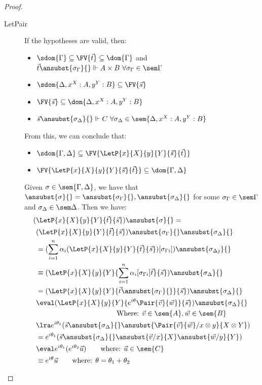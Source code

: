 \begin{proof}
\begin{description}
    \item[LetPair] If the hypotheses are valid, then:
    \begin{itemize}
        \item $\sdom{\Gamma}\subseteq \FV{\vec t} \subseteq \dom{\Gamma}$ and $\vec t \ansubst{\sigma_\Gamma}{}\Vdash A\times B\ \forall \sigma_\Gamma\in\sem\Gamma$
        \item $\sdom{\Delta, {x}^{X}:A, {y}^{Y}:B}\subseteq\FV{\vec s}$
        \item $\FV{\vec{s}}\subseteq \dom{\Delta, {x}^{X}:A, {y}^{Y}:B}$
        \item $\vec s \ansubst{\sigma_\Delta}{}\Vdash C\ \forall \sigma_\Delta\in\sem{\Delta, {x}^{X}:A, {y}^{Y}:B}$
    \end{itemize}
    From this, we can conclude that:
    \begin{itemize}
        \item $\sdom{\Gamma,\Delta}\subseteq\FV{\LetP{x}{X}{y}{Y}{\vec{s}}{\vec{t}}}$
        \item $\FV{\LetP{x}{X}{y}{Y}{\vec{s}}{\vec{t}}}\subseteq\dom{\Gamma,\Delta}$
    \end{itemize}
    
    Given $\sigma\in\sem{\Gamma,\Delta}$, we have that $\ansubst{\sigma}{}=\ansubst{\sigma_\Gamma}{},\ansubst{\sigma_\Delta}{}$ for some $\sigma_\Gamma\in\sem\Gamma$ and $\sigma_\Delta\in\sem\Delta$. Then we have:
    \begin{align*}
        (&\LetP{x}{X}{y}{Y}{\vec{t}}{\vec{s}})\ansubst{\sigma}{} = \\
        &(\LetP{x}{X}{y}{Y}{\vec{t}}{\vec{s}})\ansubst{\sigma_\Gamma}{}\ansubst{\sigma_\Delta}{}\\
        &= (\sum_{i=1}^{n}\alpha_i(\LetP{x}{X}{y}{Y}{\vec{t}}{\vec{s}})[\sigma_{\Gamma i}])\ansubst{\sigma_{\Delta j}}{}\\
        &\equiv (\LetP{x}{X}{y}{Y}{\sum_{i=1}^{n}\alpha_i[\sigma_{\Gamma i}]\vec{t}}{\vec{s}})\ansubst{\sigma_\Delta}{}\\
        &= (\LetP{x}{X}{y}{Y}{\vec{t}\ansubst{\sigma_\Gamma}{}}{\vec{s}})\ansubst{\sigma_\Delta}{}\\
        &\eval (\LetP{x}{X}{y}{Y}{e^{i\theta} \Pair{\vec{v}}{\vec{w}}}{\vec{s}})\ansubst{\sigma_\Delta}{}\\
        &\hspace*{4cm}{\text{Where: }}\vec{v}\in\sem{A},\vec{w}\in\sem{B}\\
        &\lra e^{i\theta_1} (\vec{s}\ansubst{\sigma_\Delta}{}\ansubst{\Pair{\vec{v}}{\vec{w}}/x\otimes y}{X\otimes Y})\\
        &= e^{i\theta_1} (\vec{s}\ansubst{\sigma_\Delta}{}\ansubst{\vec{v}/x}{X}\ansubst{\vec{w}/y}{Y})\\
        &\eval e^{i\theta_1}  (e^{i\theta_2}  \vec{u})\qquad\text{where: }\vec{u}\in\sem{C}\\
        &\equiv e^{i\theta}  \vec{u}\qquad\text{where: }\theta=\theta_1 + \theta_2
    \end{align*}
    

\end{description}
\end{proof}
